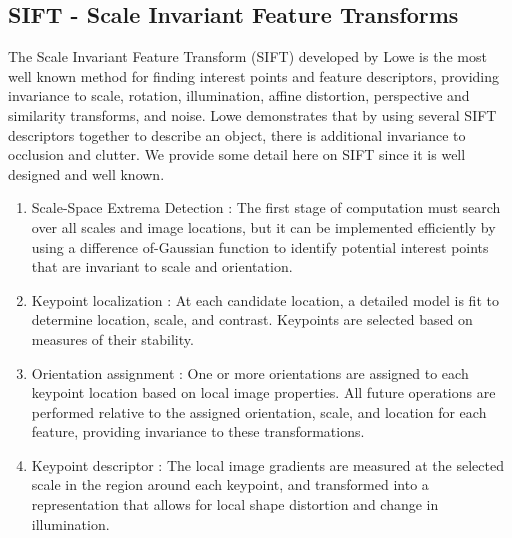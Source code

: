 \subsection{SIFT - Scale Invariant Feature Transforms} \label{siftSection}

The Scale Invariant Feature Transform (SIFT) developed by Lowe \cite{lowe} is the most well known method for finding interest points and feature descriptors, providing invariance to scale, rotation, illumination, affine distortion, perspective and similarity
transforms, and noise. Lowe demonstrates that by using several SIFT descriptors together to describe an object, there is additional invariance to occlusion and clutter. We provide some detail here on SIFT since it is well designed and well known.


\begin{enumerate}
\item Scale-Space Extrema Detection :
The first stage of computation must search over all
scales and image locations, but it can be implemented efficiently by using a difference of-Gaussian
function to identify potential interest points that are invariant to scale and
orientation.
\item Keypoint localization :
At each candidate location, a detailed model is fit to determine
location, scale, and contrast. Keypoints are selected based on measures of their
stability.
\item Orientation assignment :
One or more orientations are assigned to each keypoint
location based on local image properties. All future operations are performed relative
to the assigned orientation, scale, and location for each feature, providing invariance
to these transformations.
\item Keypoint descriptor  :
The local image gradients are measured at the selected scale
in the region around each keypoint, and transformed into a representation that allows
for local shape distortion and change in illumination.
\end{enumerate}

